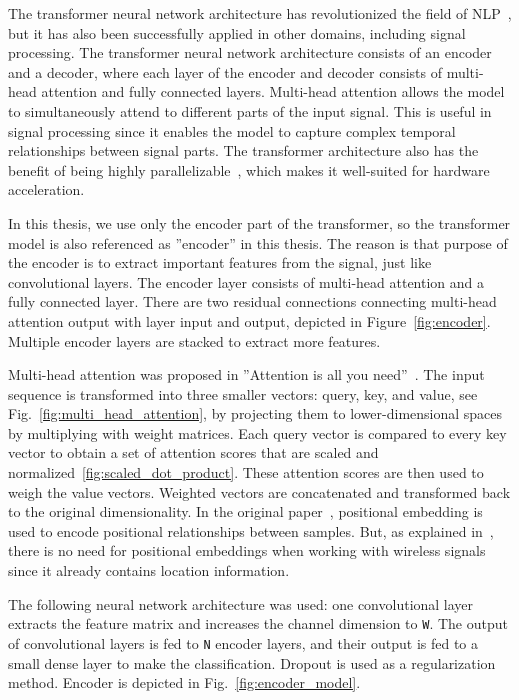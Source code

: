 The transformer neural network architecture has revolutionized the field of NLP~\cite{transformer_nlp_applications}, but it has also been successfully applied in other domains, including signal processing. The transformer neural network architecture consists of an encoder and a decoder, where each layer of the encoder and decoder consists of multi-head attention and fully connected layers. Multi-head attention allows the model to simultaneously attend to different parts of the input signal. This is useful in signal processing since it enables the model to capture complex temporal relationships between signal parts. The transformer architecture also has the benefit of being highly parallelizable~\cite{attention_is_all_you_need}, which makes it well-suited for hardware acceleration.

In this thesis, we use only the encoder part of the transformer, so the transformer model is also referenced as ''encoder'' in this thesis. The reason is that purpose of the encoder is to extract important features from the signal, just like convolutional layers. The encoder layer consists of multi-head attention and a fully connected layer. There are two residual connections connecting multi-head attention output with layer input and output, depicted in Figure~\ref{fig:encoder}. Multiple encoder layers are stacked to extract more features. 

Multi-head attention was proposed in ''Attention is all you need''~\cite{attention_is_all_you_need}. The input sequence is transformed into three smaller vectors: query, key, and value, see Fig.~\ref{fig:multi_head_attention}, by projecting them to lower-dimensional spaces by multiplying with weight matrices. Each query vector is compared to every key vector to obtain a set of attention scores that are scaled and normalized~\ref{fig:scaled_dot_product}. These attention scores are then used to weigh the value vectors. Weighted vectors are concatenated and transformed back to the original dimensionality. In the original paper~\cite{attention_is_all_you_need}, positional embedding is used to encode positional relationships between samples. But, as explained in~\cite{glu_transormer}, there is no need for positional embeddings when working with wireless signals since it already contains location information. 

The following neural network architecture was used: one convolutional layer extracts the feature matrix and increases the channel dimension to \verb|W|. The output of convolutional layers is fed to \verb|N| encoder layers, and their output is fed to a small dense layer to make the classification. Dropout is used as a regularization method. Encoder is depicted in Fig.~\ref{fig:encoder_model}.

